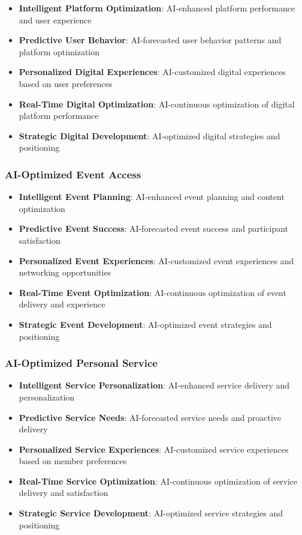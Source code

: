 \begin{itemize}
    \item \textbf{Intelligent Platform Optimization}: AI-enhanced platform performance and user experience
    \item \textbf{Predictive User Behavior}: AI-forecasted user behavior patterns and platform optimization
    \item \textbf{Personalized Digital Experiences}: AI-customized digital experiences based on user preferences
    \item \textbf{Real-Time Digital Optimization}: AI-continuous optimization of digital platform performance
    \item \textbf{Strategic Digital Development}: AI-optimized digital strategies and positioning
\end{itemize}

\subsubsection{AI-Optimized Event Access}

\begin{itemize}
    \item \textbf{Intelligent Event Planning}: AI-enhanced event planning and content optimization
    \item \textbf{Predictive Event Success}: AI-forecasted event success and participant satisfaction
    \item \textbf{Personalized Event Experiences}: AI-customized event experiences and networking opportunities
    \item \textbf{Real-Time Event Optimization}: AI-continuous optimization of event delivery and experience
    \item \textbf{Strategic Event Development}: AI-optimized event strategies and positioning
\end{itemize}

\subsubsection{AI-Optimized Personal Service}

\begin{itemize}
    \item \textbf{Intelligent Service Personalization}: AI-enhanced service delivery and personalization
    \item \textbf{Predictive Service Needs}: AI-forecasted service needs and proactive delivery
    \item \textbf{Personalized Service Experiences}: AI-customized service experiences based on member preferences
    \item \textbf{Real-Time Service Optimization}: AI-continuous optimization of service delivery and satisfaction
    \item \textbf{Strategic Service Development}: AI-optimized service strategies and positioning
\end{itemize}

